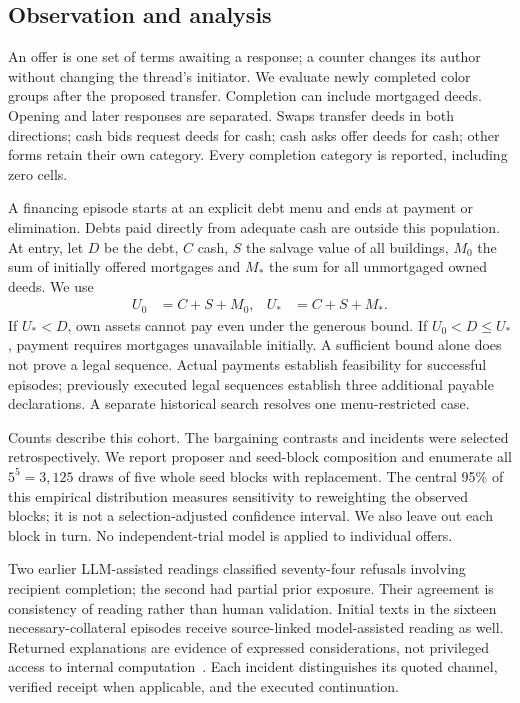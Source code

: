\subsection{Observation and analysis}
An offer is one set of terms awaiting a response; a counter changes its author without changing the thread's initiator. We evaluate newly completed color groups after the proposed transfer. Completion can include mortgaged deeds. Opening and later responses are separated. Swaps transfer deeds in both directions; cash bids request deeds for cash; cash asks offer deeds for cash; other forms retain their own category. Every completion category is reported, including zero cells.

A financing episode starts at an explicit debt menu and ends at payment or elimination. Debts paid directly from adequate cash are outside this population. At entry, let $D$ be the debt, $C$ cash, $S$ the salvage value of all buildings, $M_0$ the sum of initially offered mortgages and $M_*$ the sum for all unmortgaged owned deeds. We use
\begin{align}
U_0&=C+S+M_0, & U_*&=C+S+M_*.
\end{align}
If $U_*<D$, own assets cannot pay even under the generous bound. If $U_0<D\leq U_*$, payment requires mortgages unavailable initially. A sufficient bound alone does not prove a legal sequence. Actual payments establish feasibility for successful episodes; previously executed legal sequences establish three additional payable declarations. A separate historical search resolves one menu-restricted case.

Counts describe this cohort. The bargaining contrasts and incidents were selected retrospectively. We report proposer and seed-block composition and enumerate all $5^5=3,125$ draws of five whole seed blocks with replacement. The central 95\% of this empirical distribution measures sensitivity to reweighting the observed blocks; it is not a selection-adjusted confidence interval. We also leave out each block in turn. No independent-trial model is applied to individual offers.

Two earlier LLM-assisted readings classified seventy-four refusals involving recipient completion; the second had partial prior exposure. Their agreement is consistency of reading rather than human validation. Initial texts in the sixteen necessary-collateral episodes receive source-linked model-assisted reading as well. Returned explanations are evidence of expressed considerations, not privileged access to internal computation~\cite{turpin2023unfaithful,lanham2023faithfulness}. Each incident distinguishes its quoted channel, verified receipt when applicable, and the executed continuation.
